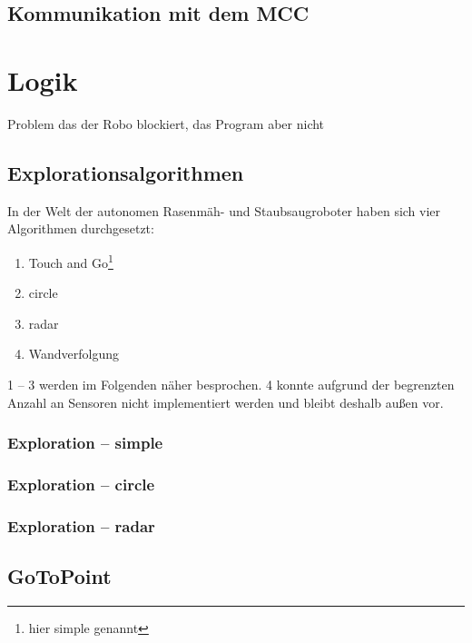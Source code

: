 \documentclass[10pt,a4paper]{scrartcl}
\begin{document}
\subsection{Kommunikation mit dem MCC}
\section{Logik}
Problem das der Robo blockiert, das Program aber nicht
\subsection{Explorationsalgorithmen}
In der Welt der autonomen Rasenmäh- und Staubsaugroboter haben sich vier Algorithmen durchgesetzt:
\begin{enumerate}
\item Touch and Go\footnote{hier simple genannt}
\item circle
\item radar
\item Wandverfolgung
\end{enumerate}
1 -- 3 werden im Folgenden näher besprochen. 4 konnte aufgrund der begrenzten Anzahl an Sensoren nicht implementiert werden und bleibt deshalb außen vor. 
\subsubsection{Exploration -- simple}
\subsubsection{Exploration -- circle}
\subsubsection{Exploration -- radar}
\subsection{GoToPoint}
\end{document}
